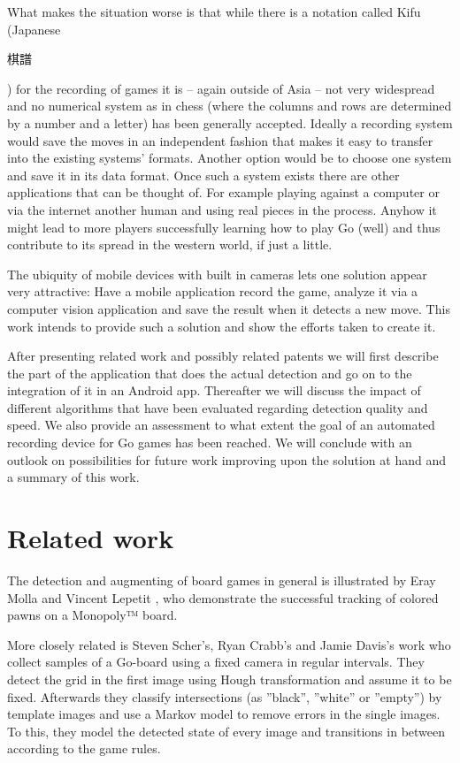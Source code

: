 	What makes the situation worse is that while there is a notation called Kifu (Japanese \begingroup\setmainfont{Droid Sans Japanese}\small\begin{CJK}{UTF8}{min}棋譜\end{CJK}\endgroup ) for the recording of games it is -- again outside of Asia -- not very widespread and no numerical system as in chess (where the columns and rows are determined by a number and a letter) has been generally accepted. Ideally a recording system would save the moves in an independent fashion that makes it easy to transfer into the existing systems' formats. Another option would be to choose one system and save it in its data format. Once such a system exists there are other applications that can be thought of. For example playing against a computer or via the internet another human and using real pieces in the process. Anyhow it might lead to more players successfully learning how to play Go (well) and thus contribute to its spread in the western world, if just a little.

	The ubiquity of mobile devices with built in cameras lets one solution appear very attractive: Have a mobile application record the game, analyze it via a computer vision application and save the result when it detects a new move. This	work intends to provide such a solution and show the efforts taken to create it.

	After presenting related work and possibly related patents we will first describe the part of the application that does the actual detection and go on to the integration of it in an Android app. Thereafter we will discuss the impact of different algorithms that have been evaluated regarding detection quality and speed. We also provide an assessment to what extent the goal of an automated recording device for Go games has been reached. We will conclude with an outlook on possibilities for future work improving upon the solution at hand and a summary of this work.


	\section{Related work}
	\label{introduction-work}
	The detection and augmenting of board games in general is illustrated by Eray Molla and Vincent Lepetit \cite{molla2010augmented}, who demonstrate the successful tracking of colored pawns on a Monopoly™ board.

	More closely related is  Steven Scher's, Ryan Crabb's and Jamie Davis's work \cite{scher2008making} who collect samples of a Go-board using a fixed camera in regular intervals. They detect the grid in the first image using Hough transformation and assume it to be fixed. Afterwards they classify intersections (as ''black'', ''white'' or ''empty'') by template images and use a Markov model to remove errors in the single images. To this, they model the detected state of every image and transitions in between according to the game rules.

